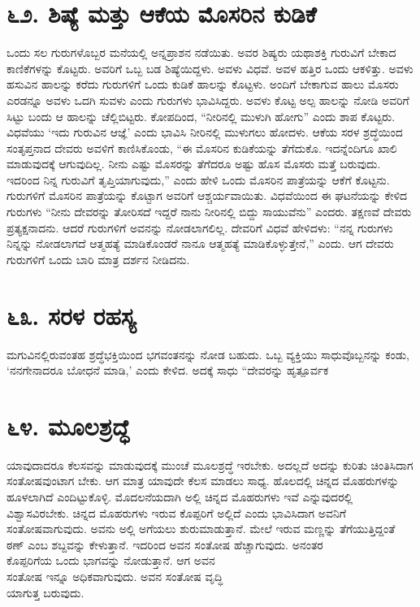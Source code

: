 \section{\num{೬೨. } ಶಿಷ್ಯೆ ಮತ್ತು ಆಕೆಯ ಮೊಸರಿನ ಕುಡಿಕೆ}

ಒಂದು ಸಲ ಗುರುಗಳೊಬ್ಬರ ಮನೆಯಲ್ಲಿ ಅನ್ನಪ್ರಾಶನ ನಡೆಯಿತು. ಅವರ ಶಿಷ್ಯರು ಯಥಾಶಕ್ತಿ ಗುರುವಿಗೆ ಬೇಕಾದ ಕಾಣಿಕೆಗಳನ್ನು ಕೊಟ್ಟರು. ಅವರಿಗೆ ಒಬ್ಬ ಬಡ ಶಿಷ್ಯೆಯಿದ್ದಳು. ಅವಳು ವಿಧವೆ. ಅವಳ ಹತ್ತಿರ ಒಂದು ಆಕಳಿತ್ತು. ಅವಳು ಹಸುವಿನ ಹಾಲನ್ನು ಕರೆದು ಗುರುಗಳಿಗೆ ಒಂದು ಕುಡಿಕೆ ಹಾಲನ್ನು ಕೊಟ್ಟಳು. ಅಂದಿಗೆ ಬೇಕಾಗುವ ಹಾಲು ಮೊಸರು ಎರಡನ್ನೂ ಅವಳು ಒದಗಿ ಸುವಳು ಎಂದು ಗುರುಗಳು ಭಾವಿಸಿದ್ದರು. ಅವಳು ಕೊಟ್ಟ ಅಲ್ಪ ಹಾಲನ್ನು ನೋಡಿ ಅವರಿಗೆ ಸಿಟ್ಟು ಬಂದು ಆ ಹಾಲನ್ನು ಚೆಲ್ಲಿಬಿಟ್ಟರು. ಕೋಪದಿಂದ, “ನೀರಿನಲ್ಲಿ ಮುಳುಗಿ ಹೋಗು” ಎಂದು ಶಾಪ ಕೊಟ್ಟರು. ವಿಧವೆಯು ‘ಇದು ಗುರುವಿನ ಆಜ್ಞೆ’ ಎಂದು ಭಾವಿಸಿ ನೀರಿನಲ್ಲಿ ಮುಳುಗಲು ಹೋದಳು. ಆಕೆಯ ಸರಳ ಶ್ರದ್ಧೆಯಿಂದ ಸಂತೃಪ್ತನಾದ ದೇವರು ಅವಳಿಗೆ ಕಾಣಿಸಿಕೊಂಡು, “ಈ ಮೊಸರಿನ ಕುಡಿಕೆಯನ್ನು ತೆಗೆದುಕೊ. ಇದನ್ನೆಂದಿಗೂ ಖಾಲಿ ಮಾಡುವುದಕ್ಕೆ ಆಗುವುದಿಲ್ಲ. ನೀನು ಎಷ್ಟು ಮೊಸರನ್ನು ತೆಗೆದರೂ ಅಷ್ಟು ಹೊಸ ಮೊಸರು ಮತ್ತೆ ಬರುವುದು. ಇದರಿಂದ ನಿನ್ನ ಗುರುವಿಗೆ ತೃಪ್ತಿಯಾಗುವುದು,” ಎಂದು ಹೇಳಿ ಒಂದು ಮೊಸರಿನ ಪಾತ್ರೆಯನ್ನು ಆಕೆಗೆ ಕೊಟ್ಟನು. ಗುರುಗಳಿಗೆ ಮೊಸರಿನ ಪಾತ್ರೆಯನ್ನು ಕೊಟ್ಟಾಗ ಅವರಿಗೆ ಆಶ್ಚರ್ಯವಾಯಿತು. ವಿಧವೆಯಿಂದ ಈ ಘಟನೆಯನ್ನು ಕೇಳಿದ ಗುರುಗಳು “ನೀನು ದೇವರನ್ನು ತೋರಿಸದೆ ಇದ್ದರೆ ನಾನು ನೀರಿನಲ್ಲಿ ಬಿದ್ದು ಸಾಯುವೆನು” ಎಂದರು. ತಕ್ಷಣವೆ ದೇವರು ಪ್ರತ್ಯಕ್ಷನಾದನು. ಆದರೆ ಗುರುಗಳಿಗೆ ಅವನನ್ನು ನೋಡಲಾಗಲಿಲ್ಲ. ದೇವರಿಗೆ ವಿಧವೆ ಹೇಳಿದಳು: “ನನ್ನ ಗುರುಗಳು ನಿನ್ನನ್ನು ನೋಡಲಾಗದೆ ಆತ್ಮಹತ್ಯೆ ಮಾಡಿಕೊಂಡರೆ ನಾನೂ ಆತ್ಮಹತ್ಯೆ ಮಾಡಿಕೊಳ್ಳುತ್ತೇನೆ,” ಎಂದು. ಆಗ ದೇವರು ಗುರುಗಳಿಗೆ ಒಂದು ಬಾರಿ ಮಾತ್ರ ದರ್ಶನ ನೀಡಿದನು.


\section{\num{೬೩.} ಸರಳ ರಹಸ್ಯ}

ಮಗುವಿನಲ್ಲಿರುವಂತಹ ಶ್ರದ್ಧೆಭಕ್ತಿಯಿಂದ ಭಗವಂತನನ್ನು ನೋಡ ಬಹುದು. ಒಬ್ಬ ವ್ಯಕ್ತಿಯು ಸಾಧುವೊಬ್ಬನನ್ನು ಕಂಡು, ‘ನನಗೇನಾದರೂ ಬೋಧನೆ ಮಾಡಿ,’ ಎಂದು ಕೇಳಿದ. ಅದಕ್ಕೆ ಸಾಧು “ದೇವರನ್ನು ಹೃತ್ಪೂರ್ವಕ



\section{\num{೬೪.} ಮೂಲಶ್ರದ್ಧೆ}

ಯಾವುದಾದರೂ ಕೆಲಸವನ್ನು ಮಾಡುವುದಕ್ಕೆ ಮುಂಚೆ ಮೂಲಶ್ರದ್ಧೆ ಇರಬೇಕು. ಅದಲ್ಲದೆ ಅದನ್ನು ಕುರಿತು ಚಿಂತಿಸಿದಾಗ ಸಂತೋಷವುಂಟಾಗ ಬೇಕು. ಆಗ ಮಾತ್ರ ಯಾವುದೇ ಕೆಲಸ ಮಾಡಲು ಸಾಧ್ಯ. ಹೊಲದಲ್ಲಿ ಚಿನ್ನದ ಮೊಹರುಗಳನ್ನು ಹೂಳಲಾಗಿದೆ ಎಂದಿಟ್ಟುಕೊಳ್ಳಿ. ಮೊದಲನೆಯದಾಗಿ ಅಲ್ಲಿ ಚಿನ್ನದ ಮೊಹರುಗಳು ಇವೆ ಎನ್ನುವುದರಲ್ಲಿ ವಿಶ್ವಾಸವಿರಬೇಕು. ಚಿನ್ನದ ಮೊಹರುಗಳು ಇರುವ ಕೊಪ್ಪರಿಗೆ ಅಲ್ಲಿದೆ ಎಂದು ಭಾವಿಸಿದಾಗ ಅವನಿಗೆ ಸಂತೋಷವಾಗುವುದು. ಅವನು ಅಲ್ಲಿ ಅಗೆಯಲು ಶುರುಮಾಡುತ್ತಾನೆ. ಮೇಲೆ ಇರುವ ಮಣ್ಣನ್ನು ತೆಗೆಯುತ್ತಿದ್ದಂತೆ ಠಣ್ ಎಂಬ ಶಬ್ದವನ್ನು ಕೇಳುತ್ತಾನೆ. ಇದರಿಂದ ಅವನ ಸಂತೋಷ ಹೆಚ್ಚಾಗುವುದು. ಅನಂತರ\\ಕೊಪ್ಪರಿಗೆಯ ಒಂದು ಭಾಗವನ್ನು ನೋಡುತ್ತಾನೆ. ಆಗ ಅವನ\\ಸಂತೋಷ ಇನ್ನೂ ಅಧಿಕವಾಗುವುದು. ಅವನ ಸಂತೋಷ ವೃದ್ಧಿ\\ಯಾಗುತ್ತ ಬರುವುದು.

